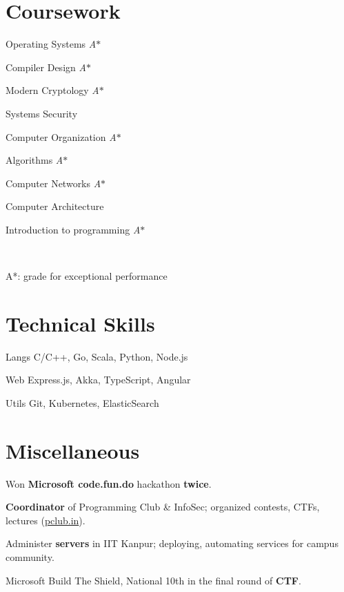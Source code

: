 \documentclass{tccv}
\newcommand{\astar}[0]{\small{\textit{A$*$}}}
\begin{document}
\section{Coursework}
\begin{inlinelist}
\item Operating Systems \astar
\item Compiler Design \astar\\
\item Modern Cryptology \astar
\item Systems Security\\
\item Computer Organization \astar
\item Algorithms \astar
\item Computer Networks \astar
\item Computer Architecture
\item Introduction to programming \astar
\end{inlinelist}\\
{\small A*: grade for exceptional performance\par}

\vspace{-0.4cm}
\section{Technical Skills}

\begin{factlist}
\item{\small{Langs}}
  {C/C++, Go, Scala, Python, Node.js}

\item{\small{Web}}
  {Express.js, Akka, TypeScript, Angular}

\item {\small{Utils}}
  {Git, Kubernetes, ElasticSearch}

\end{factlist}

\vspace{-0.3cm}
\section{Miscellaneous}
\vspace{0.2cm}
\begin{thinitemize}
\item Won \textbf{Microsoft code.fun.do} hackathon \textbf{twice}.
\item \textbf{Coordinator} of Programming Club \& InfoSec; organized
  contests, CTFs, lectures (\href{http://pclub.in}{pclub.in}).
\item Administer \textbf{servers} in IIT Kanpur; deploying,
  automating services for campus community.
\item Microsoft Build The Shield, National 10th in the final round of
  \textbf{CTF}.
\end{thinitemize}
\end{document}
